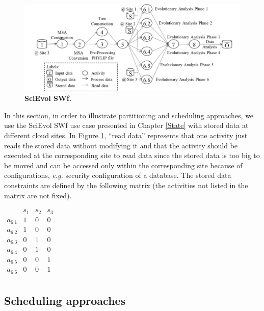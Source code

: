 \begin{figure}[htbp]
\begin{centering}
\captionsetup{justification=centering}
\includegraphics[width=140mm]{figures/FIG2}
\par\end{centering}
\caption{\textbf{SciEvol SWf. }}
\label{fig:scievol}
\end{figure}

In this section, in order to illustrate partitioning and scheduling approaches, we use the SciEvol SWf use case presented in Chapter \ref{State} with stored data at different cloud sites.
In Figure \ref{fig:scievol}, \enquote{read data} represents that one activity just reads the stored data without modifying it and that the activity should be executed at the corresponding site to read data since the stored data is too big to be moved and can be 
accessed only within the corresponding site because of configurations, \textit{e.g.} security configuration of a database. The stored data constraints are defined by the following matrix (the activities not listed in the matrix are not fixed).

$
\begin{matrix}
 & s_1 & s_2 & s_3 \\
 a_{6.1} &  1 & 0 & 0 \\
 a_{6.2} & 1 & 0 & 0 \\
 a_{6.3} & 0 & 1 & 0 \\
 a_{6.4} & 0 & 1 & 0 \\
 a_{6.5} & 0 & 0 & 1 \\
 a_{6.6} & 0 & 0 & 1 \\
\end{matrix}
$


\subsection{Scheduling approaches}


